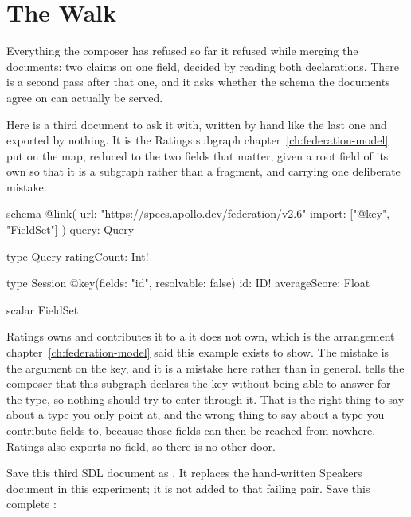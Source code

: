 \section{The Walk}
\label{sec:ch07-the-walk}

%
Everything the composer has refused so far it refused while merging the
documents: two claims on one field, decided by reading both declarations. There
is a second pass after that one, and it asks whether the schema the documents
agree on can actually be served.

%
Here is a third document to ask it with, written by hand like the last one and
exported by nothing. It is the Ratings subgraph
chapter~\ref{ch:federation-model} put on the map, reduced to the two fields
that matter, given a root field of its own so that it is a subgraph rather than
a fragment, and carrying one deliberate mistake:

\begin{graphqlsdl}
schema
  @link(
    url: "https://specs.apollo.dev/federation/v2.6"
    import: ["@key", "FieldSet"]
  ) {
  query: Query
}

type Query {
  ratingCount: Int!
}

type Session @key(fields: "id", resolvable: false) {
  id: ID!
  averageScore: Float
}

scalar FieldSet
\end{graphqlsdl}

%
Ratings owns  and contributes it to a  it does
not own, which is the arrangement chapter~\ref{ch:federation-model} said this
example exists to show. The mistake is the argument on the key, and it is a
mistake here rather than in general.  tells the
composer that this subgraph declares the key without being able to answer for
the type, so nothing should try to enter through it. That is the right thing
to say about a type you only point at, and the wrong thing to say about a type
you contribute fields to, because those fields can then be reached from
nowhere. Ratings also exports no  field, so there is no other door.

%
Save this third SDL document as . It replaces
the hand-written Speakers document in this experiment; it is not added to
that failing pair. Save this complete :


